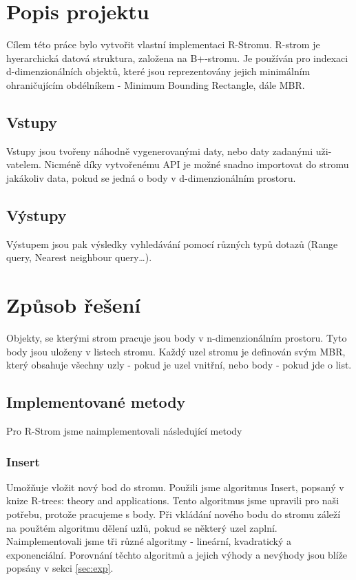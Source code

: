 \documentclass[a4paper,10pt]{article}
\begin{document}
\clearpage

\section{Popis projektu}
Cílem této práce bylo vytvořit vlastní implementaci R-Stromu. R-strom je hyerarchická datová struktura, založena na B+-stromu. Je používán pro indexaci d-dimenzionálních objektů, které jsou reprezentovány jejich minimálním ohraničujícím obdélníkem - Minimum Bounding Rectangle, dále MBR. \cite{rtree}

\subsection*{Vstupy}
Vstupy jsou tvořeny náhodně vygenerovanými daty, nebo daty zadanými uži-vatelem. Nicméně díky vytvořenému API je možné snadno importovat do stromu jakákoliv data, pokud se jedná o body v d-dimenzionálním prostoru.

\subsection*{Výstupy}
Výstupem jsou pak výsledky vyhledávání pomocí různých typů dotazů (Range query, Nearest neighbour query\dots). 
\section{Způsob řešení}
Objekty, se kterými strom pracuje jsou body v n-dimenzionálním prostoru. Tyto body jsou uloženy v listech stromu. Každý uzel stromu je definován svým MBR, který obsahuje všechny uzly - pokud je uzel vnitřní, nebo body - pokud jde o list.

\subsection{Implementované metody}
Pro R-Strom jsme naimplementovali následující metody


\subsubsection*{Insert}
Umožňuje vložit nový bod do stromu. Použili jsme algoritmus Insert, popsaný v knize R-trees: theory and applications.\cite{rtree} Tento algoritmus jsme upravili pro naši potřebu, protože pracujeme s body. Při vkládání nového bodu do stromu záleží na použtém algoritmu dělení uzlů, pokud se některý uzel zaplní. Naimplementovali jsme tři různé algoritmy - lineární, kvadratický a exponenciální. Porovnání těchto algoritmů a jejich výhody a nevýhody jsou blíže popsány v sekci \ref{sec:exp}.
\end{document}

